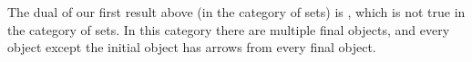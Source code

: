 \documentclass{seminar}
\newcommand{\CC}{\tm{\cal C}}
\begin{document}
\begin{slide}
The dual of our first result above (in the
category of sets) is , which
is not true in the category of sets.  In this category there are
multiple final objects, and every object except the initial object
has arrows from every final object.

\newslide



\newslide














\end{slide}
\end{document}
